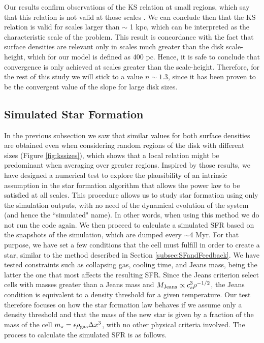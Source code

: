 \documentclass[twocolumn]{aastex}
\newcommand{\mstar}{m_\star}
\newcommand{\rhogas}{\rho_{\rm gas}}
\begin{document}
Our results confirm observations of the KS relation at small regions, which say that this relation is not valid at those scales \citep{Onodera_10, Verley_10}. We can conclude then that the KS relation is valid for scales larger than $\sim$ 1 kpc, which can be interpreted as the characteristic scale of the problem. This result is concordance with the fact that surface densities are relevant only in scales much greater than the disk scale-height, which for our model is defined as 400 pc. Hence, it is safe to conclude that convergence is only achieved at scales greater than the scale-height. Therefore, for the rest of this study we will stick to a value $n \sim 1.3$, since it has been proven to be the convergent value of the slope for large disk sizes.

\subsection{Simulated Star Formation}
\label{subsec:simulatedsfr}

In the previous subsection we saw that similar values for both surface densities are obtained even when considering random regions of the disk with different sizes (Figure \ref{fig:kssizes}), which shows that a local relation might be predominant when averaging over greater regions. Inspired by those results, we have designed a numerical test to explore the plausibility of an intrinsic assumption in the star formation algorithm that allows the power law to be satisfied at all scales. This procedure allows us to study star formation using only the simulation outputs, with no need of the dynamical evolution of the system (and hence the ``simulated" name). In other words, when using this method we do not run the code again. We then proceed to calculate a simulated SFR based on the snapshots of the simulation, which are dumped every $\sim$4 Myr. For that purpose, we have set a few conditions that the cell must fulfill in order to create a star, similar to the method described in Section \ref{subsec:SFandFeedback}. We have tested constraints such as collapsing gas, cooling time, and Jeans mass, being the latter the one that most affects the resulting SFR. Since the Jeans criterion select cells with masses greater than a Jeans mass and $M_{\rm Jeans} \propto c^3_s \rho^{-1/2}$, the Jeans condition is equivalent to a density threshold for a given temperature. Our test therefore focuses on how the star formation law behaves if we assume only a density threshold and that the mass of the new star is given by a fraction of the mass of the cell $\mstar=\epsilon\rhogas\Delta x^3$, with no other physical criteria involved. The process to calculate the simulated SFR is as follows.
\end{document}
